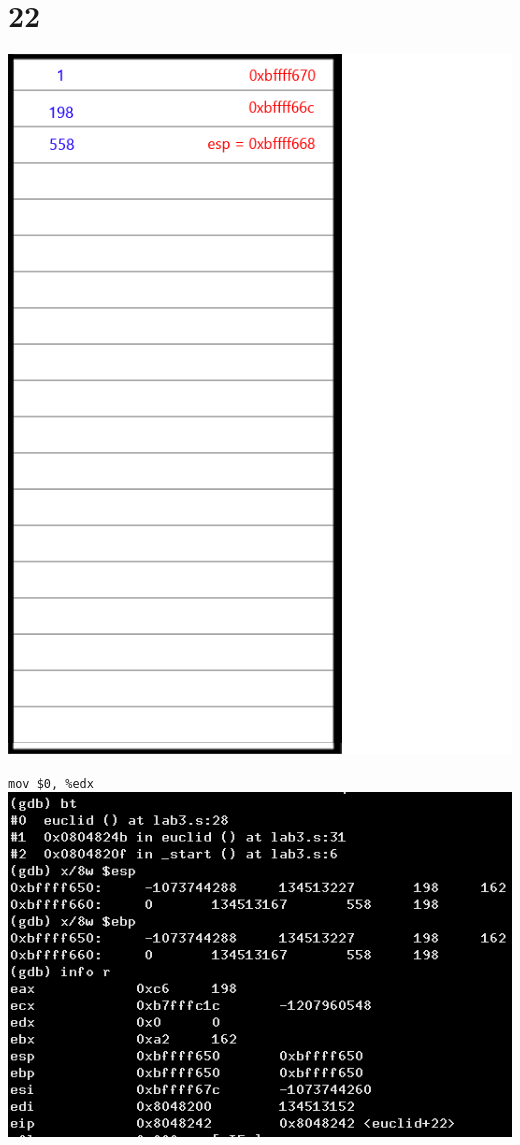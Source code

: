 \documentclass{article}
\begin{document}
\section*{22}
\begin{minipage}{5cm}
\includegraphics[scale=0.3]{s3.png}
\end{minipage}
\begin{minipage}{8cm}
\verb|mov $0, %edx|\\
\includegraphics[scale=0.4]{bxi22.png} \\
\end{minipage}
\clearpage
\end{document}

